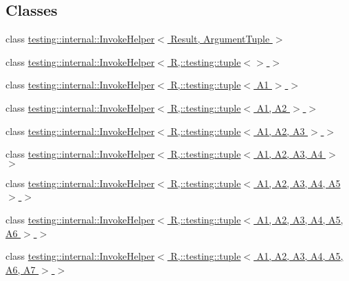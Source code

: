 \subsection*{Classes}
\begin{DoxyCompactItemize}
\item 
class \hyperlink{classtesting_1_1internal_1_1_invoke_helper}{testing\+::internal\+::\+Invoke\+Helper$<$ Result, Argument\+Tuple $>$}
\item 
class \hyperlink{classtesting_1_1internal_1_1_invoke_helper_3_01_r_00_1_1testing_1_1tuple_3_4_01_4}{testing\+::internal\+::\+Invoke\+Helper$<$ R,\+::testing\+::tuple$<$$>$ $>$}
\item 
class \hyperlink{classtesting_1_1internal_1_1_invoke_helper_3_01_r_00_1_1testing_1_1tuple_3_01_a1_01_4_01_4}{testing\+::internal\+::\+Invoke\+Helper$<$ R,\+::testing\+::tuple$<$ A1 $>$ $>$}
\item 
class \hyperlink{classtesting_1_1internal_1_1_invoke_helper_3_01_r_00_1_1testing_1_1tuple_3_01_a1_00_01_a2_01_4_01_4}{testing\+::internal\+::\+Invoke\+Helper$<$ R,\+::testing\+::tuple$<$ A1, A2 $>$ $>$}
\item 
class \hyperlink{classtesting_1_1internal_1_1_invoke_helper_3_01_r_00_1_1testing_1_1tuple_3_01_a1_00_01_a2_00_01_a3_01_4_01_4}{testing\+::internal\+::\+Invoke\+Helper$<$ R,\+::testing\+::tuple$<$ A1, A2, A3 $>$ $>$}
\item 
class \hyperlink{classtesting_1_1internal_1_1_invoke_helper_3_01_r_00_1_1testing_1_1tuple_3_01_a1_00_01_a2_00_01_a3_00_01_a4_01_4_01_4}{testing\+::internal\+::\+Invoke\+Helper$<$ R,\+::testing\+::tuple$<$ A1, A2, A3, A4 $>$ $>$}
\item 
class \hyperlink{classtesting_1_1internal_1_1_invoke_helper_3_01_r_00_1_1testing_1_1tuple_3_01_a1_00_01_a2_00_01_a3_00_01_a4_00_01_a5_01_4_01_4}{testing\+::internal\+::\+Invoke\+Helper$<$ R,\+::testing\+::tuple$<$ A1, A2, A3, A4, A5 $>$ $>$}
\item 
class \hyperlink{classtesting_1_1internal_1_1_invoke_helper_3_01_r_00_1_1testing_1_1tuple_3_01_a1_00_01_a2_00_01_6f3c1b6c3435aa3488b058deeeb8a74f}{testing\+::internal\+::\+Invoke\+Helper$<$ R,\+::testing\+::tuple$<$ A1, A2, A3, A4, A5, A6 $>$ $>$}
\item 
class \hyperlink{classtesting_1_1internal_1_1_invoke_helper_3_01_r_00_1_1testing_1_1tuple_3_01_a1_00_01_a2_00_01_afc7fa334bddd6bdae263bb7183b22d4}{testing\+::internal\+::\+Invoke\+Helper$<$ R,\+::testing\+::tuple$<$ A1, A2, A3, A4, A5, A6, A7 $>$ $>$}
\item 

\end{DoxyCompactItemize}
